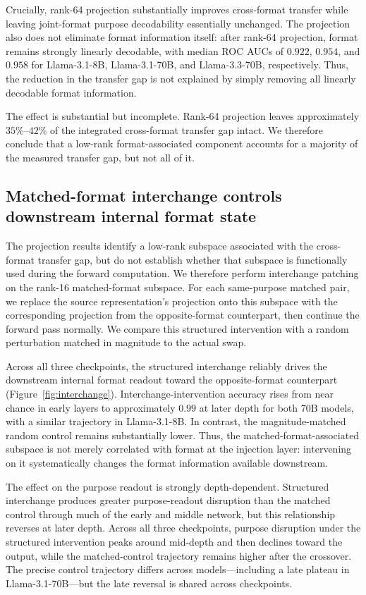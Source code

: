 {\color{blue}
Crucially, rank-64 projection substantially improves cross-format transfer while
leaving joint-format purpose decodability essentially unchanged. The projection
also does not eliminate format information itself: after rank-64 projection,
format remains strongly linearly decodable, with median ROC AUCs of \(0.922\),
\(0.954\), and \(0.958\) for Llama-3.1-8B, Llama-3.1-70B, and
Llama-3.3-70B, respectively. Thus, the reduction in the transfer gap is not
explained by simply removing all linearly decodable format information.

The effect is substantial but incomplete. Rank-64 projection leaves
approximately \(35\%\)--\(42\%\) of the integrated cross-format transfer gap
intact. We therefore conclude that a low-rank format-associated component
accounts for a majority of the measured transfer gap, but not all of it.


\subsection{Matched-format interchange controls downstream internal format state}
\label{sec:results_interchange}

The projection results identify a low-rank subspace associated with the
cross-format transfer gap, but do not establish whether that subspace is
functionally used during the forward computation. We therefore perform
interchange patching on the rank-16 matched-format subspace. For each
same-purpose matched pair, we replace the source representation's projection
onto this subspace with the corresponding projection from the opposite-format
counterpart, then continue the forward pass normally. We compare this structured
intervention with a random perturbation matched in magnitude to the actual swap.

Across all three checkpoints, the structured interchange reliably drives the
downstream internal format readout toward the opposite-format counterpart
(Figure~\ref{fig:interchange}). Interchange-intervention accuracy rises from near
chance in early layers to approximately \(0.99\) at later depth for both 70B
models, with a similar trajectory in Llama-3.1-8B. In contrast, the
magnitude-matched random control remains substantially lower. Thus, the
matched-format-associated subspace is not merely correlated with format at the
injection layer: intervening on it systematically changes the format information
available downstream.

The effect on the purpose readout is strongly depth-dependent. Structured
interchange produces greater purpose-readout disruption than the matched control
through much of the early and middle network, but this relationship reverses at
later depth. Across all three checkpoints, purpose disruption under the
structured intervention peaks around mid-depth and then declines toward the
output, while the matched-control trajectory remains higher after the crossover.
The precise control trajectory differs across models---including a late plateau
in Llama-3.1-70B---but the late reversal is shared across checkpoints.

}
